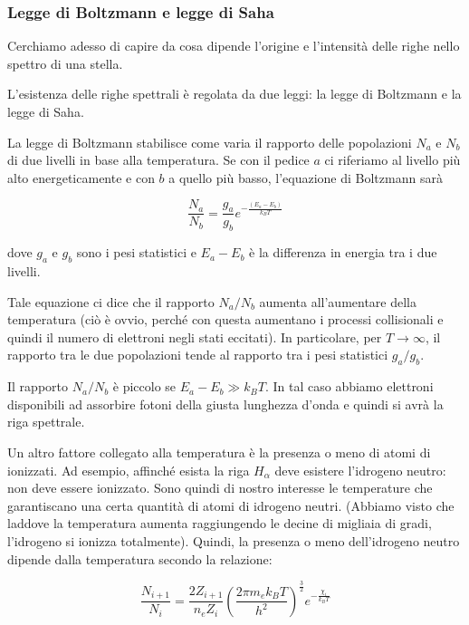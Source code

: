 \subsubsection{Legge di Boltzmann e legge di Saha}
Cerchiamo adesso di capire da cosa dipende l'origine e l'intensità delle righe nello spettro di una stella. 

L'esistenza delle righe spettrali è regolata da due leggi: la legge di Boltzmann e la legge di Saha.

La legge di Boltzmann stabilisce come varia il rapporto delle popolazioni $N_a$ e $N_b$ di due livelli in base alla temperatura. Se con il pedice $a$ ci riferiamo al livello più alto energeticamente e con $b$ a quello più basso, l'equazione di Boltzmann sarà

\begin{equation}
  \frac{N_a}{N_b}=\frac{g_a}{g_b}e^{-\frac{(E_a - E_b)}{k_B T}}
  \label{eq:legge_di_Boltzmann}
\end{equation}

dove $g_a$ e $g_b$ sono i pesi statistici e $E_a - E_b$ è la differenza in energia tra i due livelli.

Tale equazione ci dice che il rapporto $N_a/N_b$ aumenta all'aumentare della temperatura (ciò è ovvio, perché con questa aumentano i processi collisionali e quindi il numero di elettroni negli stati eccitati). In particolare, per $T \to \infty$, il rapporto tra le due popolazioni tende al rapporto tra i pesi statistici $g_a/g_b$.

Il rapporto $N_a/N_b$ è piccolo se $E_a - E_b \gg k_B T$. In tal caso abbiamo elettroni disponibili ad assorbire fotoni della giusta lunghezza d'onda e quindi si avrà la riga spettrale.

\vspace{0.2cm}Un altro fattore collegato alla temperatura è la presenza o meno di atomi di ionizzati. Ad esempio, affinché esista la riga $H_{\alpha}$ deve esistere l'idrogeno neutro: non deve essere ionizzato. Sono quindi di nostro interesse le temperature che garantiscano una certa quantità di atomi di idrogeno neutri. (Abbiamo visto che laddove la temperatura aumenta raggiungendo le decine di migliaia di gradi, l'idrogeno si ionizza totalmente). Quindi, la presenza o meno dell'idrogeno neutro dipende dalla temperatura secondo la relazione:

\begin{equation}
  \frac{N_{i+1}}{N_i}=\frac{2 Z_{i+1}}{n_e Z_i} \left( \frac{2 \pi m_e k_B T}{h^2} \right)^{\frac{3}{2}} e^{-\frac{\chi_i}{k_B T}}
\end{equation}

